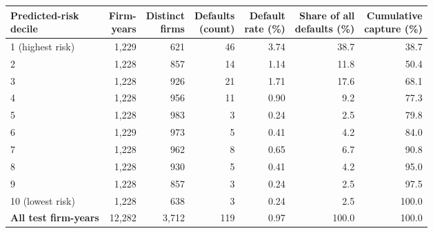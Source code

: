 \documentclass[9pt,letterpaper]{extarticle}
\begin{document}
\begin{center}
\footnotesize
\setlength{\tabcolsep}{5pt}
\begin{tabular}{@{}l*{6}{r}@{}}
\toprule
\shortstack[r]{\textbf{Predicted-risk}\\\textbf{decile}} & \shortstack[r]{\textbf{Firm-}\\\textbf{years}} & \shortstack[r]{\textbf{Distinct}\\\textbf{firms}} & \shortstack[r]{\textbf{Defaults}\\\textbf{(count)}} & \shortstack[r]{\textbf{Default}\\\textbf{rate (\%)}} & \shortstack[r]{\textbf{Share of all}\\\textbf{defaults (\%)}} & \shortstack[r]{\textbf{Cumulative}\\\textbf{capture (\%)}} \\
\midrule
1 (highest risk) & 1,229 & 621 & 46 & 3.74 & 38.7 & 38.7 \\
2 & 1,228 & 857 & 14 & 1.14 & 11.8 & 50.4 \\
3 & 1,228 & 926 & 21 & 1.71 & 17.6 & 68.1 \\
4 & 1,228 & 956 & 11 & 0.90 & 9.2 & 77.3 \\
5 & 1,228 & 983 & 3 & 0.24 & 2.5 & 79.8 \\
6 & 1,229 & 973 & 5 & 0.41 & 4.2 & 84.0 \\
7 & 1,228 & 962 & 8 & 0.65 & 6.7 & 90.8 \\
8 & 1,228 & 930 & 5 & 0.41 & 4.2 & 95.0 \\
9 & 1,228 & 857 & 3 & 0.24 & 2.5 & 97.5 \\
10 (lowest risk) & 1,228 & 638 & 3 & 0.24 & 2.5 & 100.0 \\
\midrule
\textbf{All test firm-years} & 12,282 & 3,712 & 119 & 0.97 & 100.0 & 100.0 \\
\bottomrule
\end{tabular}
\par\vspace{2pt}
\end{center}
\end{document}
